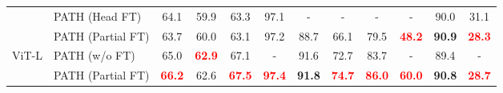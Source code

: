 \documentclass[10pt,twocolumn,letterpaper]{article}
\begin{document}
\begin{table*}[htbp]
\begin{minipage}[t]{\textwidth}
{\begin{tabular}{cl|cccccccccc}
& PATH (Head FT) & 64.1  & 59.9  & 63.3  & \cellcolor[rgb]{ .949,  .949,  .949} 97.1  & -   & -   & -   & \cellcolor[rgb]{ .949,  .949,  .949} - & 90.0  & \cellcolor[rgb]{ .949,  .949,  .949} 31.1 \\
          & PATH (Partial FT) & 63.7  & 60.0  & 63.1  & \cellcolor[rgb]{ .949,  .949,  .949} 97.2  & 88.7  & 66.1  & 79.5  & \cellcolor[rgb]{ .949,  .949,  .949} \textcolor{red}{\textbf{48.2}}  & \textbf{90.9}  & \cellcolor[rgb]{ .949,  .949,  .949} \textcolor{red}{\textbf{28.3}}  \\
    \midrule
    \multirow{2}[2]{*}{ViT-L} & PATH (w/o FT) & 65.0  & \textcolor{red}{\textbf{62.9}}  & 67.1  & \cellcolor[rgb]{ .949,  .949,  .949} - & 91.6  & 72.7  & 83.7  & \cellcolor[rgb]{ .949,  .949,  .949} - & 89.4  & \cellcolor[rgb]{ .949,  .949,  .949} - \\
          & PATH (Partial FT) & \textcolor{red}{\textbf{66.2}}  & 62.6  & \textcolor{red}{\textbf{67.5}}  & \cellcolor[rgb]{ .949,  .949,  .949} \textcolor{red}{\textbf{97.4}}  & \textbf{91.8}  & \textcolor{red}{\textbf{74.7}}  & \textcolor{red}{\textbf{86.0}}  & \cellcolor[rgb]{ .949,  .949,  .949} \textcolor{red}{\textbf{60.0}}  & \textbf{90.8}  & \cellcolor[rgb]{ .949,  .949,  .949} \textcolor{red}{\textbf{28.7}}  \\
    \toprule
	\end{tabular}
	}
  \end{minipage}
  \begin{minipage}[t]{0.996\textwidth}
  \centering
\end{minipage}
\end{table*}
\end{document}

